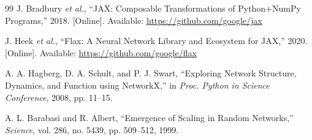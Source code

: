 \documentclass[12pt,oneside]{report}
\begin{document}
\begin{singlespace}
\begin{thebibliography}{99}
J. Bradbury \textit{et al.}, ``JAX: Composable Transformations of Python+NumPy Programs,'' 2018. [Online]. Available: \url{https://github.com/google/jax}

J. Heek \textit{et al.}, ``Flax: A Neural Network Library and Ecosystem for JAX,'' 2020. [Online]. Available: \url{https://github.com/google/flax}

A. A. Hagberg, D. A. Schult, and P. J. Swart, ``Exploring Network Structure, Dynamics, and Function using NetworkX,'' in \textit{Proc. Python in Science Conference}, 2008, pp. 11--15.

A. L. Barabasi and R. Albert, ``Emergence of Scaling in Random Networks,'' \textit{Science}, vol. 286, no. 5439, pp. 509--512, 1999.
\end{thebibliography}
\end{singlespace}
\end{document}
